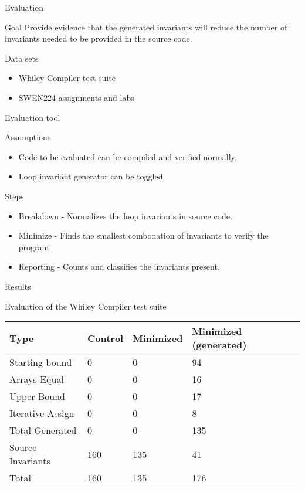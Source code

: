\begin{frame}{Evaluation}

\begin{block}{Goal}
Provide evidence that the generated invariants will reduce the
number of invariants needed to be provided in the source code.
\end{block}

\begin{block}{Data sets}

\begin{itemize}
\item Whiley Compiler test suite
\item SWEN224 assignments and labs
\end{itemize}

\end{block}

\end{frame}


\begin{frame}{Evaluation tool}

\begin{block}{Assumptions}

\begin{itemize}
\item Code to be evaluated can be compiled and verified normally.
\item Loop invariant generator can be toggled.
\end{itemize}

\end{block}


\begin{block}{Steps}
\begin{itemize}
\item Breakdown - Normalizes the loop invariants in source code.
\item Minimize - Finds the smallest combonation of invariants to verify
the program.
\item Reporting - Counts and classifies the invariants present.
\end{itemize}
\end{block}

\end{frame}


\begin{frame}{Results}

Evaluation of the Whiley Compiler test suite

\begin{longtable}[]{@{}llll@{}}
\toprule
    Type & Control & Minimized & Minimized (generated)\tabularnewline
\midrule
\endhead
Starting bound & 0 & 0 & 94\tabularnewline
Arrays Equal & 0 & 0 & 16\tabularnewline
Upper Bound & 0 & 0 & 17\tabularnewline
Iterative Assign & 0 & 0 & 8\tabularnewline
Total Generated & 0 & 0 & 135\tabularnewline
\hline
Source Invariants & 160 & 135 & 41\tabularnewline
\bottomrule
Total & 160 & 135 & 176\tabularnewline
\end{longtable}

\end{frame}



